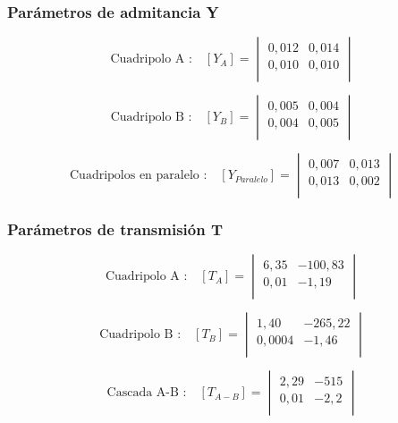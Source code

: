 \documentclass[a4paper]{article}
\begin{document}
\subsubsection*{Parámetros de admitancia Y}

\begin{equation}
\text{Cuadripolo A :}\quad [Y_{A}] =
\begin{vmatrix}
	0,012 & 0,014\\
	0,010 & 0,010\\
\end{vmatrix}
\end{equation}

\begin{equation}
\text{Cuadripolo B :}\quad [Y_{B}] =
\begin{vmatrix}
	0,005 & 0,004\\
	0,004 & 0,005\\
\end{vmatrix}
\end{equation}

\begin{equation}
\text{Cuadripolos en paralelo :}\quad [Y_{Paralelo}] =
\begin{vmatrix}
	0,007 & 0,013\\
	0,013 & 0,002\\
\end{vmatrix}
\end{equation}

\subsubsection*{Parámetros de transmisión T}

\begin{equation}
\text{Cuadripolo A :}\quad [T_{A}] =
\begin{vmatrix}
	6,35 & -100,83\\
	0,01 & -1,19\\
\end{vmatrix}
\end{equation}

\begin{equation}
\text{Cuadripolo B :}\quad [T_{B}] =
\begin{vmatrix}
	1,40 & -265,22\\
	0,0004 & -1,46\\
\end{vmatrix}
\end{equation}

\begin{equation}
\text{Cascada A-B :}\quad [T_{A-B}] =
\begin{vmatrix}
	2,29 & -515\\
	0,01 & -2,2\\
\end{vmatrix}
\end{equation}
\end{document}
